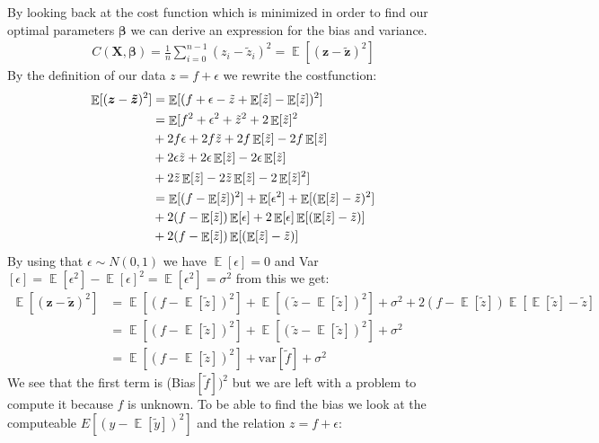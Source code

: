 \documentclass[12pt]{article}
\DeclareMathOperator*{\E}{\mathbb{E}}
\begin{document}
By looking back at the cost function which is minimized in order to find our optimal parameters $\boldsymbol{\beta}$ we can derive an expression for the bias and variance.
\begin{align*}
  C(\boldsymbol{X}, \boldsymbol{\beta}) = \frac{1 }{n }\sum_ {i=0}^{n-1}(z_i - \tilde{z}_i)^2 = \E[(\boldsymbol{z}- \boldsymbol{\tilde{z}})^2]
\end{align*}
By the definition of our data $z = f +\epsilon$ we rewrite the costfunction:
\begin{align*}
  \E[(\boldsymbol{z}- \boldsymbol{\tilde{z}})^2] &= \E[(f + \epsilon - \tilde{z} + \E[\tilde{z}]- \E[\tilde{z}])^2] \\                                             &= \E[f^2 + \epsilon^2 + \tilde{z}^2 + 2\E[\tilde{z}]^2 \\
                                                 &+ 2f\epsilon + 2f\tilde{z} + 2f\E[\tilde{z}] - 2f\E[\tilde{z}]\\
                                                 &+ 2\epsilon\tilde{z} + 2\epsilon \E[\tilde{z}] - 2\epsilon \E[\tilde{z}]\\
                                                 &+ 2\tilde{z}\E[\tilde{z}] - 2\tilde{z}\E[\tilde{z}] -2\E[\tilde{z}]^2]\\
                                                 &= \E[(f-\E[\Tilde{z}])^2] + \E[\epsilon^2] + \E[( \E[\Tilde{z}] - \Tilde{z} )^2] \\
                                                 &+ 2(f-\E[\tilde{z}])\E[\epsilon]+2\E[\epsilon]\E[(\E[\tilde{z}]-\tilde{z} )] \\
                                                &+ 2(f-\E[\tilde{z}])\E[( \E[\tilde{z}] - \tilde{z} )]
\end{align*}
By using that $\epsilon \sim N(0,1)$ we have $\E[\epsilon] = 0$ and Var$[\epsilon] = \E[\epsilon^2]- \E[\epsilon]^2 = \E[\epsilon^2]=\sigma^2$ from this we get:
\begin{align*}
  \E[(\boldsymbol{z}- \boldsymbol{\tilde{z}})^2] &=\E[(f -\E[\tilde{z}])^2] +\E[( \tilde{z} -\E[\tilde{z}])^2]  + \sigma^2+ 2(f-\E[\tilde{z}])\E[\E[\tilde{z}] -\tilde{z}]\\
  &=\E[(f -\E[\tilde{z}])^2]  + \E[( \tilde{z} -\E[\tilde{z}])^2]+\sigma^2\\
  &= \E[(f -\E[\tilde{z}])^2]  + \text{var}[\tilde{f}] + \sigma^2
\end{align*}
We see that the first term is (Bias$[\tilde{f}])^2$ but we are left with a problem to compute it because $f$ is unknown. To be able to find the bias we look at the computeable $E[(y - \E[\tilde{y}])^2]$ and the relation $z= f + \epsilon$:
\end{document}
